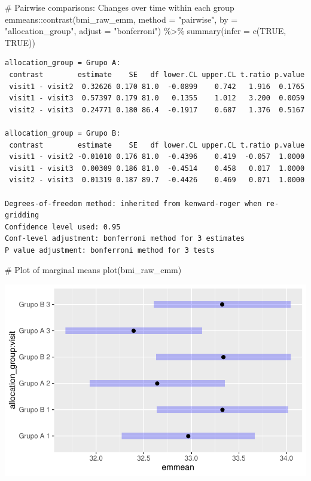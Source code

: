 \documentclass[
  12pt,
]{article}
\newenvironment{Shaded}{\begin{snugshade}}{\end{snugshade}}
\newcommand{\AttributeTok}[1]{\textcolor[rgb]{0.40,0.45,0.13}{#1}}
\newcommand{\CommentTok}[1]{\textcolor[rgb]{0.37,0.37,0.37}{#1}}
\newcommand{\ConstantTok}[1]{\textcolor[rgb]{0.56,0.35,0.01}{#1}}
\newcommand{\FunctionTok}[1]{\textcolor[rgb]{0.28,0.35,0.67}{#1}}
\newcommand{\NormalTok}[1]{\textcolor[rgb]{0.00,0.23,0.31}{#1}}
\newcommand{\SpecialCharTok}[1]{\textcolor[rgb]{0.37,0.37,0.37}{#1}}
\newcommand{\StringTok}[1]{\textcolor[rgb]{0.13,0.47,0.30}{#1}}
\begin{document}
\begin{Shaded}
\begin{Highlighting}[]
\CommentTok{\# Pairwise comparisons: Changes over time within each group}
\NormalTok{emmeans}\SpecialCharTok{::}\FunctionTok{contrast}\NormalTok{(bmi\_raw\_emm,}
\AttributeTok{method =} \StringTok{"pairwise"}\NormalTok{, }\AttributeTok{by =} \StringTok{"allocation\_group"}\NormalTok{,}
\AttributeTok{adjust =} \StringTok{"bonferroni"}\NormalTok{) }\SpecialCharTok{\%\textgreater{}\%} \FunctionTok{summary}\NormalTok{(}\AttributeTok{infer =} \FunctionTok{c}\NormalTok{(}\ConstantTok{TRUE}\NormalTok{, }\ConstantTok{TRUE}\NormalTok{))}
\end{Highlighting}
\end{Shaded}

\begin{verbatim}
allocation_group = Grupo A:
 contrast        estimate    SE   df lower.CL upper.CL t.ratio p.value
 visit1 - visit2  0.32626 0.170 81.0  -0.0899    0.742   1.916  0.1765
 visit1 - visit3  0.57397 0.179 81.0   0.1355    1.012   3.200  0.0059
 visit2 - visit3  0.24771 0.180 86.4  -0.1917    0.687   1.376  0.5167

allocation_group = Grupo B:
 contrast        estimate    SE   df lower.CL upper.CL t.ratio p.value
 visit1 - visit2 -0.01010 0.176 81.0  -0.4396    0.419  -0.057  1.0000
 visit1 - visit3  0.00309 0.186 81.0  -0.4514    0.458   0.017  1.0000
 visit2 - visit3  0.01319 0.187 89.7  -0.4426    0.469   0.071  1.0000

Degrees-of-freedom method: inherited from kenward-roger when re-gridding 
Confidence level used: 0.95 
Conf-level adjustment: bonferroni method for 3 estimates 
P value adjustment: bonferroni method for 3 tests 
\end{verbatim}

\begin{Shaded}
\begin{Highlighting}[]
\CommentTok{\# Plot of marginal means}
\FunctionTok{plot}\NormalTok{(bmi\_raw\_emm)}
\end{Highlighting}
\end{Shaded}

\includegraphics{Outcomes_files/figure-pdf/bmi_raw_emm-1.pdf}
\end{document}
